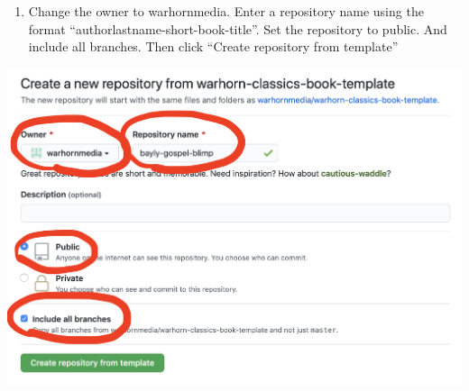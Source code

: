 \documentclass[
]{book}
\providecommand{\tightlist}{%
  \setlength{\itemsep}{0pt}\setlength{\parskip}{0pt}}
\begin{document}
\begin{enumerate}
\def\labelenumi{\arabic{enumi}.}
\setcounter{enumi}{1}
\tightlist
\item
  Change the owner to warhornmedia. Enter a repository name using the format ``authorlastname-short-book-title''. Set the repository to public. And include all branches. Then click ``Create repository from template''
\end{enumerate}

\begin{center}\includegraphics[width=0.65\linewidth]{images/screenshot2} \end{center}
\end{document}
